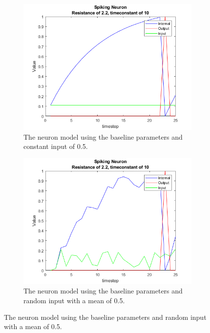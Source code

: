 \begin{figure}
    \centering
    \begin{subfigure}[b]{0.3\textwidth}
        \includegraphics[width=\textwidth]{Images/slow.png}
        \caption{The neuron model using the baseline parameters and constant input of 0.5.}
        \label{fig:implementation_test}
    \end{subfigure}
    \begin{subfigure}[b]{0.3\textwidth}
        \includegraphics[width=\textwidth]{Images/randomInput.png}
        \caption{The neuron model using the baseline parameters and random input with a mean of 0.5.}
        \label{fig:implementation_test}
    \end{subfigure}

\end{figure}
